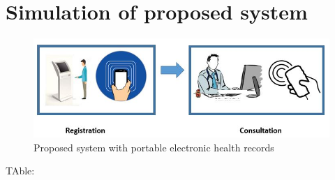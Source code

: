 \documentclass[12pt,a4paper]{report}
\begin{document}
\section{Simulation of proposed system}
\begin{figure}[h!]
	\begin{center}
		\includegraphics[scale=0.6]{propo.jpg}
		\caption{Proposed system with portable electronic health records}
	\end{center}
\end{figure}
TAble:
\end{document}
